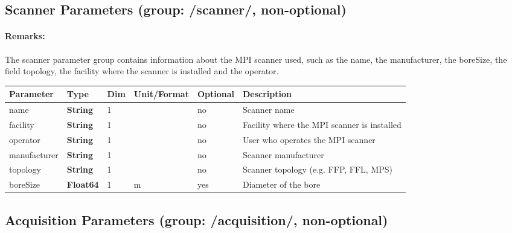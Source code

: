 \documentclass[landscape,a4paper]{article} %
\newcommand{\inltab}[1]{{\ttfamily\bfseries\color{blue}#1}}
\newcommand{\inlvar}[1]{{\ttfamily#1}}
\begin{document}
\subsection{Scanner Parameters (group: \inlvar{/scanner/}, non-optional)}

\begin{multicols}{2}
\paragraph{Remarks:} The scanner parameter group contains information about the MPI scanner used, such as the \inlvar{name}, the \inlvar{manufacturer}, the \inlvar{boreSize}, the field \inlvar{topology}, the \inlvar{facility} where the scanner is installed and the \inlvar{operator}.
\end{multicols}

\noindent \begin{tabularx}{\columnwidth}{lllllX}
\noindent \textbf{Parameter} & \textbf{Type} & \textbf{Dim} & \textbf{Unit/Format} & \textbf{Optional} & \textbf{Description} \\ \hline 
\inlvar{name} & \inltab{String} & 1 & & no & Scanner name \\ \hline 
\inlvar{facility} & \inltab{String} & 1 & & no & Facility where the MPI scanner is installed \\ \hline 
\inlvar{operator} & \inltab{String} & 1 & & no & User who operates the MPI scanner \\ \hline 
\inlvar{manufacturer} & \inltab{String} & 1 & & no & Scanner manufacturer \\ \hline 
\inlvar{topology} & \inltab{String} & 1 & & no & Scanner topology (e.g. FFP, FFL, MPS)\\ \hline 
\inlvar{boreSize} & \inltab{Float64} & 1 & m & yes & Diameter of the bore \\ \hline 
\end{tabularx}


\subsection{Acquisition Parameters (group: \inlvar{/acquisition/}, non-optional)}
\end{document}

